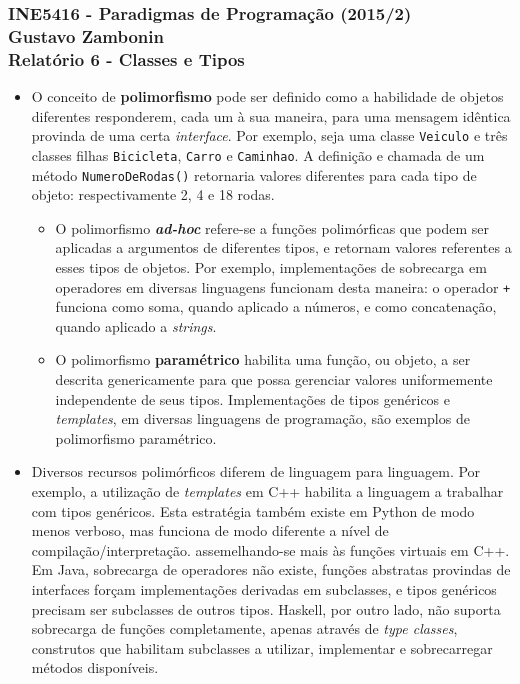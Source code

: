 \documentclass{article}
\begin{document}
\subsubsection*{INE5416 - Paradigmas de Programação (2015/2) \\
    Gustavo Zambonin \\
    Relatório 6 - Classes e Tipos
}

\begin{itemize}
    \item O conceito de \textbf{polimorfismo} pode ser definido como a habilidade de objetos diferentes responderem, cada um à sua maneira, para uma mensagem idêntica provinda de uma certa \textit{interface}. Por exemplo, seja uma classe \texttt{Veiculo} e três classes filhas \texttt{Bicicleta}, \texttt{Carro} e \texttt{Caminhao}. A definição e chamada de um método \texttt{NumeroDeRodas()} retornaria valores diferentes para cada tipo de objeto: respectivamente 2, 4 e 18 rodas.
    \begin{itemize}
        \item O polimorfismo \textbf{\textit{ad-hoc}} refere-se a funções polimórficas que podem ser aplicadas a argumentos de diferentes tipos, e retornam valores referentes a esses tipos de objetos. Por exemplo, implementações de sobrecarga em operadores em diversas linguagens funcionam desta maneira: o operador \texttt{+} funciona como soma, quando aplicado a números, e como concatenação, quando aplicado a \textit{strings}.
        \item O polimorfismo \textbf{paramétrico} habilita uma função, ou objeto, a ser descrita genericamente para que possa gerenciar valores uniformemente independente de seus tipos. Implementações de tipos genéricos e \textit{templates}, em diversas linguagens de programação, são exemplos de polimorfismo paramétrico.
    \end{itemize}
    \item Diversos recursos polimórficos diferem de linguagem para linguagem. Por exemplo, a utilização de \textit{templates} em C++ habilita a linguagem a trabalhar com tipos genéricos. Esta estratégia também existe em Python de modo menos verboso, mas funciona de modo diferente a nível de compilação/interpretação. assemelhando-se mais às funções virtuais em C++. Em Java, sobrecarga de operadores não existe, funções abstratas provindas de interfaces forçam implementações derivadas em subclasses, e tipos genéricos precisam ser subclasses de outros tipos. Haskell, por outro lado, não suporta sobrecarga de funções completamente, apenas através de \textit{type classes}, construtos que habilitam subclasses a utilizar, implementar e sobrecarregar métodos disponíveis.

\end{itemize}
\end{document}
